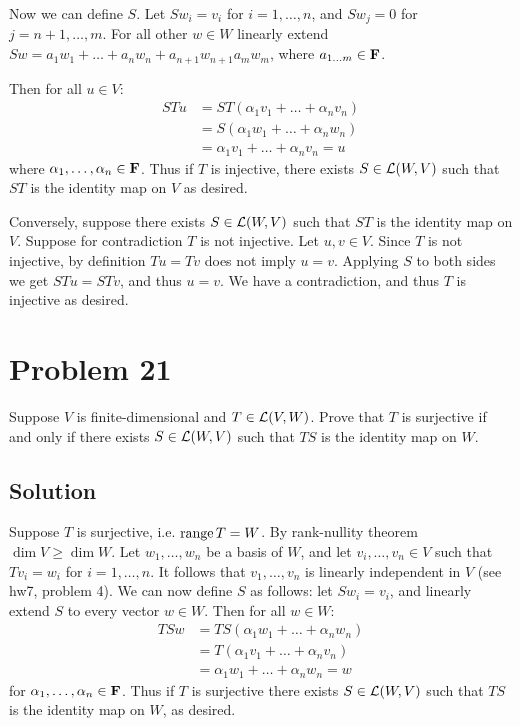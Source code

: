 \documentclass{article}
\begin{document}
\vs

Now we can define $S$. Let $Sw_i=v_i$ for $i=1,\ldots,n$, and $Sw_j=0$ for $j=n+1,\ldots,m$. For all other $w\in W$ linearly extend $Sw=a_1 w_1+\ldots+a_n w_n + a_{n+1} w_{n+1} a_m w_m$, where $a_{1\ldots m}\in\mathbf{F}$.

Then for all $u\in V$:
\begin{align*}
STu&=ST(\alpha_1v_1+\ldots+\alpha_n v_n)\\
&=S(\alpha_1w_1+\ldots+\alpha_n w_n)\\
&=\alpha_1v_1+\ldots+\alpha_n v_n=u    
\end{align*}
where $\alpha_1,\ldots,\alpha_n\in\mathbf{F}$. Thus if $T$ is injective, there exists $S\in\L(W,V)$ such that $ST$ is the identity map on $V$ as desired.

\vs

Conversely, suppose there exists $S\in\L(W,V)$ such that $ST$ is the identity map on $V$. Suppose for contradiction $T$ is not injective. Let $u,v\in V$. Since $T$ is not injective, by definition $Tu=Tv$ does not imply $u=v$. Applying $S$ to both sides we get $STu=STv$, and thus $u=v$. We have a contradiction, and thus $T$ is injective as desired.

\section*{Problem 21}
Suppose $V$ is finite-dimensional and $T\in\L(V,W)$. Prove that $T$ is surjective if and only if there exists $S\in\L(W,V)$ such that $TS$ is the identity map on $W$.

\subsection*{Solution}
Suppose $T$ is surjective, i.e. $\text{range}\, T=W$. By rank-nullity theorem $\dim V\geq\dim W$. Let $w_1,\ldots,w_n$ be a basis of $W$, and let $v_i,\ldots,v_n\in V$ such that $Tv_i=w_i$ for $i=1,\ldots,n$. It follows that $v_1,\ldots,v_n$ is linearly independent in $V$ (see hw7, problem 4). We can now define $S$ as follows: let $Sw_i=v_i$, and linearly extend $S$ to every vector $w\in W$. Then for all $w\in W$:
\begin{align*}
    TSw&=TS(\alpha_1w_1+\ldots+\alpha_n w_n)\\
    &=T(\alpha_1v_1+\ldots+\alpha_n v_n)\\
    &=\alpha_1w_1+\ldots+\alpha_n w_n=w
\end{align*}
for $\alpha_1,\ldots,\alpha_n\in\mathbf{F}$. Thus if $T$ is surjective there exists $S\in\L(W,V)$ such that $TS$ is the identity map on $W$, as desired.
\end{document}
